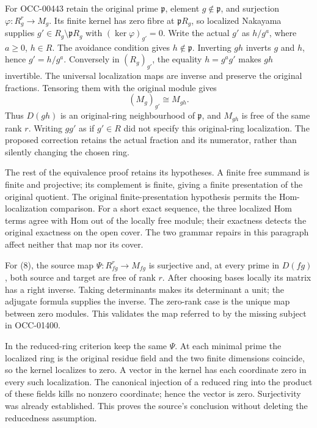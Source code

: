 For OCC-00443 retain the original prime \(\mathfrak p\), element \(g\notin\mathfrak p\), and surjection \(\varphi:R_g^r\to M_g\). Its finite kernel has zero fibre at \(\mathfrak pR_g\), so localized Nakayama supplies \(g'\in R_g\setminus\mathfrak pR_g\) with \((\ker\varphi)_{g'}=0\). Write the actual \(g'\) as \(h/g^a\), where \(a\geq0\), \(h\in R\). The avoidance condition gives \(h\notin\mathfrak p\). Inverting \(gh\) inverts \(g\) and \(h\), hence \(g'=h/g^a\). Conversely in \((R_g)_{g'}\), the equality \(h=g^ag'\) makes \(gh\) invertible. The universal localization maps are inverse and preserve the original fractions. Tensoring them with the original module gives \[
(M_g)_{g'}\cong M_{gh}.
\] Thus \(D(gh)\) is an original-ring neighbourhood of \(\mathfrak p\), and \(M_{gh}\) is free of the same rank \(r\). Writing \(gg'\) as if \(g'\in R\) did not specify this original-ring localization. The proposed correction retains the actual fraction and its numerator, rather than silently changing the chosen ring.

The rest of the equivalence proof retains its hypotheses. A finite free summand is finite and projective; its complement is finite, giving a finite presentation of the original quotient. The original finite-presentation hypothesis permits the Hom-localization comparison. For a short exact sequence, the three localized Hom terms agree with Hom out of the locally free module; their exactness detects the original exactness on the open cover. The two grammar repairs in this paragraph affect neither that map nor its cover.

For (8), the source map \(\Psi:R_{fg}^r\to M_{fg}\) is surjective and, at every prime in \(D(fg)\), both source and target are free of rank \(r\). After choosing bases locally its matrix has a right inverse. Taking determinants makes its determinant a unit; the adjugate formula supplies the inverse. The zero-rank case is the unique map between zero modules. This validates the map referred to by the missing subject in OCC-01400.

In the reduced-ring criterion keep the same \(\Psi\). At each minimal prime the localized ring is the original residue field and the two finite dimensions coincide, so the kernel localizes to zero. A vector in the kernel has each coordinate zero in every such localization. The canonical injection of a reduced ring into the product of these fields kills no nonzero coordinate; hence the vector is zero. Surjectivity was already established. This proves the source's conclusion without deleting the reducedness assumption.

